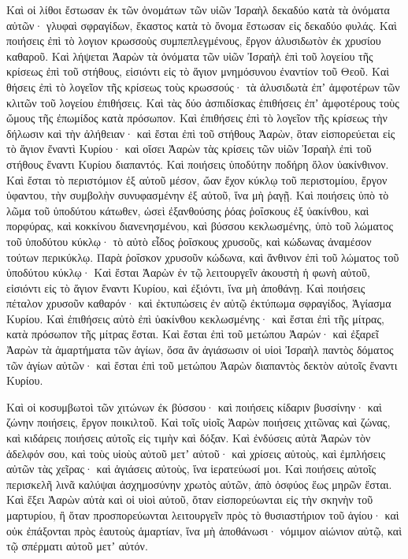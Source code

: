 {Καὶ οἱ λίθοι ἔστωσαν ἐκ τῶν ὀνομάτων τῶν υἱῶν Ἰσραὴλ δεκαδύο κατὰ τὰ ὀνόματα αὐτῶν· γλυφαὶ σφραγίδων, ἕκαστος κατὰ τὸ ὄνομα ἔστωσαν εἰς δεκαδύο φυλάς.
Καὶ ποιήσεις ἐπὶ τὸ λογιον κρωσσοὺς συμπεπλεγμένους, ἔργον ἁλυσιδωτὸν ἐκ χρυσίου καθαροῦ.
Καὶ λήψεται Ἀαρὼν τὰ ὀνόματα τῶν υἱῶν Ἰσραὴλ ἐπὶ τοῦ λογείου τῆς κρίσεως ἐπὶ τοῦ στήθους, εἰσιόντι εἰς τὸ ἅγιον μνημόσυνου ἐναντίον τοῦ Θεοῦ.
Καὶ θήσεις ἐπὶ τὸ λογεῖον τῆς κρίσεως τοὺς κρωσσούς· τὰ ἁλυσιδωτὰ ἐπʼ ἀμφοτέρων τῶν κλιτῶν τοῦ λογείου ἐπιθήσεις. Καὶ τὰς δύο ἀσπιδίσκας ἐπιθήσεις ἐπʼ ἀμφοτέρους τοὺς ὤμους τῆς ἐπωμίδος κατὰ πρόσωπον.
Καὶ ἐπιθήσεις ἐπὶ τὸ λογεῖον τῆς κρίσεως τὴν δήλωσιν καὶ τὴν ἀλήθειαν· καὶ ἔσται ἐπὶ τοῦ στήθους Ἀαρὼν, ὃταν εἰσπορεύεται εἰς τὸ ἅγιον ἔναντὶ Κυρίου· καὶ οἴσει Ἀαρὼν τὰς κρίσεις τῶν υἱῶν Ἰσραὴλ ἐπὶ τοῦ στήθους ἔναντι Κυρίου διαπαντός.
Καὶ ποιήσεις ὑποδύτην ποδήρη ὅλον ὑακίνθινον.
Καὶ ἔσται τὸ περιστόμιον ἐξ αὐτοῦ μέσον, ὤαν ἔχον κύκλῳ τοῦ περιστομίου, ἔργον ὑφαντου, τὴν συμβολὴν συνυφασμένην ἐξ αὐτοῦ, ἵνα μὴ ῥαγῇ.
Καὶ ποιήσεις ὑπὸ τὸ λῶμα τοῦ ὑποδύτου κάτωθεν, ὡσεὶ ἐξανθούσης ῥόας ῥοΐσκους ἐξ ὑακίνθου, καὶ πορφύρας, καὶ κοκκίνου διανενησμένου, καὶ βύσσου κεκλωσμένης, ὑπὸ τοῦ λώματος τοῦ ὑποδύτου κύκλῳ· τὸ αὐτὸ εἶδος ῥοΐσκους χρυσοῦς, καὶ κώδωνας ἀναμέσον τούτων περικύκλῳ.
Παρὰ ῥοΐσκον χρυσοῦν κώδωνα, καὶ ἄνθινον ἐπὶ τοῦ λώματος τοῦ ὑποδύτου κύκλῳ·
Καὶ ἔσται Ἀαρὼν ἐν τῷ λειτουργεῖν ἀκουστὴ ἡ φωνὴ αὐτοῦ, εἰσιόντι εἰς τὸ ἅγιον ἔναντι Κυρίου, καὶ ἐξιόντι, ἵνα μὴ ἀποθάνῃ.
Καὶ ποιήσεις πέταλον χρυσοῦν καθαρόν· καὶ ἐκτυπώσεις ἐν αὐτῷ ἐκτύπωμα σφραγίδος, Ἁγίασμα Κυρίου.
Καὶ ἐπιθήσεις αὐτὸ ἐπὶ ὑακίνθου κεκλωσμένης· καὶ ἔσται ἐπὶ τῆς μίτρας, κατὰ πρόσωπον τῆς μίτρας ἔσται.
Καὶ ἔσται ἐπὶ τοῦ μετώπου Ἀαρών· καὶ ἐξαρεῖ Ἀαρὼν τὰ ἁμαρτήματα τῶν ἁγίων, ὅσα ἂν ἁγιάσωσιν οἱ υἱοὶ Ἰσραὴλ παντὸς δόματος τῶν ἁγίων αὐτῶν· καὶ ἔσται ἐπὶ τοῦ μετώπου Ἀαρὼν διαπαντὸς δεκτὸν αὐτοῖς ἔναντι Κυρίου.
\par }{\PP {}Καὶ οἱ κοσυμβωτοὶ τῶν χιτώνων ἐκ βύσσου· καὶ ποιήσεις κίδαριν βυσσίνην· καὶ ζώνην ποιήσεις, ἔργον ποικιλτοῦ.
Καὶ τοῖς υἱοῖς Ἀαρὼν ποιήσεις χιτῶνας καὶ ζώνας, καὶ κιδάρεις ποιήσεις αὐτοῖς εἰς τιμὴν καὶ δόξαν.
Καὶ ἐνδύσεις αὐτὰ Ἀαρὼν τὸν ἀδελφόν σου, καὶ τοὺς υἱοὺς αὐτοῦ μετʼ αὐτοῦ· καὶ χρίσεις αὐτοὺς, καὶ ἐμπλήσεις αὐτῶν τὰς χεῖρας· καὶ ἁγιάσεις αὐτοὺς, ἵνα ἱερατεύωσί μοι.
Καὶ ποιήσεις αὐτοῖς περισκελῆ λινᾶ καλύψαι ἀσχημοσύνην χρωτὸς αὐτῶν, ἀπὸ ὀσφύος ἕως μηρῶν ἔσται.
Καὶ ἕξει Ἀαρὼν αὐτὰ καὶ οἱ υἱοὶ αὐτοῦ, ὅταν εἰσπορεύωνται εἰς τὴν σκηνὴν τοῦ μαρτυρίου, ἢ ὅταν προσπορεύωνται λειτουργεῖν πρὸς τὸ θυσιαστήριον τοῦ ἁγίου· καὶ οὐκ ἐπάξονται πρὸς ἑαυτοὺς ἁμαρτίαν, ἵνα μὴ ἀποθάνωσι· νόμιμον αἰώνιον αὐτῷ, καὶ τῷ σπέρματι αὐτοῦ μετʼ αὐτόν.

}
